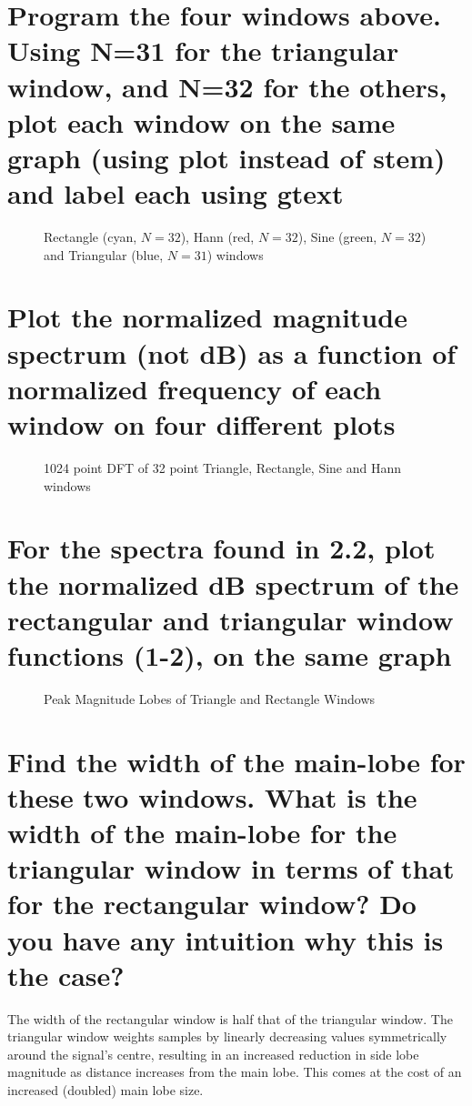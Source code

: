 \documentclass[titlepage]{scrartcl}
\begin{document}
\section{Program the four windows above. Using N=31 for the triangular
window, and N=32 for the others, plot each window on the same graph (using plot
instead of stem) and label each using gtext}

\begin{figure}[H]
    \caption{Rectangle (cyan, $N=32$), Hann (red, $N=32$), Sine (green, $N=32$) and Triangular (blue, $N=31$)
    windows }
    \label{windows}
\end{figure}

\section{Plot the normalized magnitude spectrum (not dB) as a function of
normalized frequency of each window on four different plots}
\begin{figure}[H]
    \caption{1024 point DFT of 32 point Triangle, Rectangle, Sine and Hann
    windows}
    \label{4WinFFT}
\end{figure}

\section{For the spectra found in 2.2, plot the normalized dB spectrum of the
rectangular and triangular window functions (1-2), on the same graph}
\begin{figure}[H]
    \caption{Peak Magnitude Lobes of Triangle and Rectangle Windows}
    \label{TriRectDFT}
\end{figure}

\section{Find the width of the main-lobe for these two windows. What is the
width of the main-lobe for the triangular window in terms of that for the
rectangular window? Do you have any intuition why this is the case?} The width
of the rectangular window is half that of the triangular window. The triangular
window weights samples by linearly decreasing values symmetrically around the
signal's centre, resulting in an increased reduction in side lobe magnitude as
distance increases from the main lobe. This comes at the cost of an increased
(doubled) main lobe size. 
\end{document}
